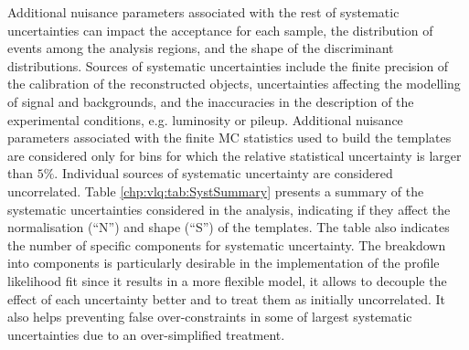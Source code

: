 Additional nuisance parameters associated with the rest of systematic uncertainties can impact the acceptance for each sample, the distribution of events among the analysis regions, and the shape of the discriminant distributions.
Sources of systematic uncertainties include the finite precision of the calibration of the reconstructed objects, uncertainties affecting the modelling of signal and backgrounds, and the inaccuracies in the description of the experimental conditions, e.g. luminosity or pileup.
Additional nuisance parameters associated with the finite MC statistics used to build the templates are considered only for bins for which the relative statistical uncertainty is larger than $5\%$.
Individual sources of systematic uncertainty are considered uncorrelated. Table \ref{chp:vlq:tab:SystSummary} presents a summary of the systematic uncertainties considered in the analysis, indicating if they affect the normalisation (``N'') and shape (``S'') of the templates. The table also indicates the number of specific components for systematic uncertainty. The breakdown into components is particularly desirable in the implementation of the profile likelihood fit since it results in a more flexible model, it allows to decouple the effect of each uncertainty better and to treat them as initially uncorrelated. It also helps preventing false over-constraints in some of largest systematic uncertainties due to an over-simplified treatment.\par

